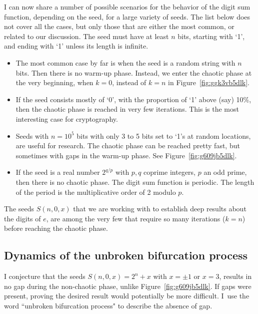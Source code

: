 \documentclass[10pt]{article}
\begin{document}
I can now share a number of possible scenarios for the behavior of the digit sum function, depending on the seed, for a large variety of seeds. The list below does not cover all the cases, but only those that are either the most common, or related to our discussion. The seed must have at least $n$ bits, starting with `1', and ending with `1' unless its length is infinite. 
\vspace{1ex}
\begin{itemize}
\item The most common case by far is when the seed is a random string with $n$ bits. Then there is no warm-up phase. Instead, we enter the chaotic phase at the very beginning, when $k=0$, instead of  $k=n$ in Figure~\ref{fig:ggk3vb5dlk}.
\item If the seed  consists mostly of `0', with the proportion of `1' above (say) 10\%, then the chaotic phase is reached in very few iterations. This is the most interesting case for cryptography.
\item Seeds with $n=10^5$ bits with only 3 to 5 bits set to `1's at random locations, are useful for research. 
The chaotic phase can be reached pretty fast, but sometimes with gaps in the warm-up phase. See Figure~\ref{fig:g609jb5dlk}. 
\item If the seed is a real number $2^{q/p}$ with $p, q$ coprime integers, $p$ an odd prime, then there is no chaotic phase. 
The digit sum function is periodic. The length of the period is  the \textcolor{index}{multiplicative order} of 2 modulo $p$.
\end{itemize}
\vspace{1ex}

\noindent The seeds $S(n,0,x)$ that we are working with to establish deep results about the digits of $e$, are among the very few that require so many iterations ($k=n$) before reaching the chaotic phase. 
       
\subsection{Dynamics of the unbroken bifurcation process}

I conjecture that the seeds $S(n,0,x) = 2^n+x$ with $x=\pm 1$ or $x=3$, results in no gap during the non-chaotic phase, unlike Figure~\ref{fig:g609jb5dlk}. If gaps were present, proving the desired result would 
potentially be more difficult. I~use the word ``unbroken bifurcation process" to describe the absence of gap.
\end{document}
